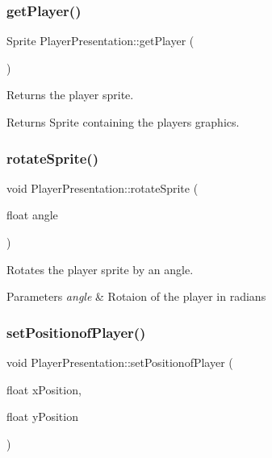 \subsubsection{\texorpdfstring{get\+Player()}{getPlayer()}}
{\footnotesize\ttfamily Sprite Player\+Presentation\+::get\+Player (\begin{DoxyParamCaption}{ }\end{DoxyParamCaption})}



Returns the player sprite. 

\begin{DoxyReturn}{Returns}
Sprite containing the players graphics. 
\end{DoxyReturn}
\mbox{\label{class_player_presentation_af938e83bf3a90263076411e0935731bd}} 
\subsubsection{\texorpdfstring{rotate\+Sprite()}{rotateSprite()}}
{\footnotesize\ttfamily void Player\+Presentation\+::rotate\+Sprite (\begin{DoxyParamCaption}\item[{float}]{angle }\end{DoxyParamCaption})}



Rotates the player sprite by an angle. 


\begin{DoxyParams}{Parameters}
{\em angle} & Rotaion of the player in radians \\
\hline
\end{DoxyParams}
\mbox{\label{class_player_presentation_aef6ba74848a34fb93528062bda98059e}} 
\subsubsection{\texorpdfstring{set\+Positionof\+Player()}{setPositionofPlayer()}}
{\footnotesize\ttfamily void Player\+Presentation\+::set\+Positionof\+Player (\begin{DoxyParamCaption}\item[{float}]{x\+Position,  }\item[{float}]{y\+Position }\end{DoxyParamCaption})}



